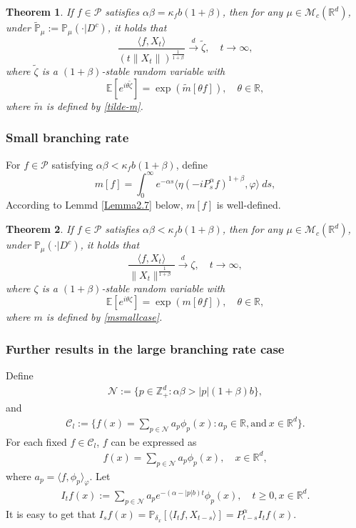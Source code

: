 \documentclass[12pt,a4paper]{amsart}
\theoremstyle{plain}
\newtheorem{thm}{Theorem}[section]
\theoremstyle{definition}
\numberwithin{equation}{section}
\begin{document}
\begin{thm}
\label{Theorem12}
    If $f\in\mathcal{P}$ satisfies  $\alpha\beta=\kappa_fb(1+\beta)$,
   then for any $\mu\in \mathcal M_c(\mathbb R^d)$, under
    $\tilde{\mathbb P}_\mu := \mathbb{P}_{\mu}(\cdot|D^c)$, it holds that
\[
    \frac{\langle f,X_t\rangle}{\left(t\|X_t\|\right)^{\frac{1}{1+\beta}}}
    \xrightarrow{d} \tilde{\zeta},
    \quad t\rightarrow \infty,
\]
    where $\tilde{\zeta}$ is a $(1+\beta)$-stable random variable with
\[
    \mathbb{E} [e^{i\theta \tilde{\zeta}}]
    =\exp(\widetilde{m}[\theta f]),
    \quad \theta\in \mathbb R,
\]
where $\widetilde{m}$ is defined by \eqref{tilde-m}.
\end{thm}

\subsubsection{Small branching rate}

For $f\in \mathcal{P}$ satisfying $\alpha\beta<\kappa_f b(1+\beta)$, define
\begin{equation}
     m[f]
    =\int_0^{\infty} e^{-\alpha s} \langle \eta (-iP_s^\alpha f)^{1+\beta}, \varphi \rangle~ds, \label{msmallcase}
\end{equation}
According to Lemmd \ref{Lemma2.7} below, $m[f]$ is well-defined.
\begin{thm}
\label{Theorem13}
    If $f\in\mathcal{P}$ satisfies  $\alpha\beta<\kappa_f b(1+\beta)$,
   then for any $\mu\in \mathcal M_c(\mathbb R^d)$, under
    $\mathbb{P}_{\mu}(\cdot|D^c)$, it holds that
    $$\frac{\langle f,X_t\rangle}{\|X_t\|^{\frac{1}{1+\beta}}}\xrightarrow{d} \zeta, \quad t\rightarrow \infty,$$
    where $\zeta$ is a $(1+\beta)$-stable random variable with
    $$\mathbb{E} [e^{i\theta \zeta}]=\exp(m[\theta f]), \quad \theta\in \mathbb R,$$
    where $m$ is defined by \eqref{msmallcase}.
\end{thm}

\subsubsection{Further results in the large branching rate case}
Define
\begin{align}
   \mathcal{N}:=\{p\in \mathbb{Z}_+^d:  \alpha\beta>|p|(1+\beta)b\},
\end{align}
and
\begin{align}
    \mathcal{C}_l:=\Big\{f(x)=\sum_{p\in\mathcal{N}}a_p\phi_p(x): a_p\in \mathbb{R}, \text{and}~ x\in\mathbb{R}^d \Big\}.
\end{align}
For each fixed $f\in \mathcal{C}_l$, $f$ can be expressed as
\begin{align}\label{discompose}
    f(x)=\sum_{p\in \mathcal{N}}a_p\phi_p(x),\quad x\in \mathbb{R}^d,
\end{align}
where $a_p=\langle f, \phi_p\rangle_{\varphi}$. Let
\begin{align}\label{definition of Itf}
    I_tf(x):=\sum_{p\in \mathcal{N}}a_pe^{-(\alpha-|p|b)t}\phi_p(x), \quad t\geq 0, x\in \mathbb{R}^d.
\end{align}
It is easy to get that $I_sf(x)=\mathbb{P}_{\delta_x}[\langle I_t f, X_{t-s}\rangle]=P_{t-s}^{\alpha}I_tf(x)$.
\end{document}
